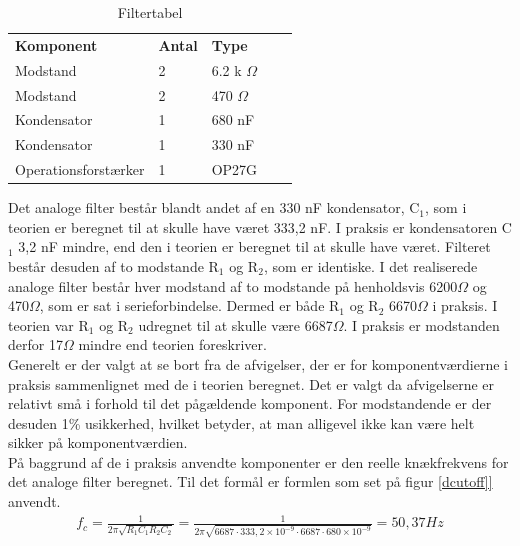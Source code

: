 \begin{table}[H]
\centering
\begin{tabular}{|l|l|l|ll}
\cline{1-3}
\textbf{Komponent} & \textbf{Antal} & \textbf{Type}  &  &  \\ \cline{1-3}
Modstand           & 2              & 6.2 k $\Omega$ &  &  \\ \cline{1-3}
Modstand           & 2              & 470 $\Omega$   &  &  \\ \cline{1-3}
Kondensator        & 1              & 680 nF         &  &  \\ \cline{1-3}
Kondensator        & 1              & 330 nF         &  &  \\ \cline{1-3}
Operationsforstærker &    1         & OP27G          &  &  \\ \cline{1-3}
\end{tabular}
\caption{Filtertabel}
\label{DFiltertabel}
\end{table}

Det analoge filter består blandt andet af en 330 nF kondensator, C$_1$, som i teorien er beregnet til at skulle have været 333,2 nF. I praksis er kondensatoren C$_1$ 3,2 nF mindre, end den i teorien er beregnet til at skulle have været. Filteret består desuden af to modstande R$_1$ og R$_2$, som er identiske. I det realiserede analoge filter består hver modstand af to modstande på henholdsvis 6200$\Omega$ og 470$\Omega$, som er sat i serieforbindelse. Dermed er både R$_1$ og R$_2$ 6670$\Omega$ i praksis. I teorien var R$_1$ og R$_2$ udregnet til at skulle være 6687$\Omega$. I praksis er modstanden derfor 17$\Omega$ mindre end teorien foreskriver.\\

Generelt er der valgt at se bort fra de afvigelser, der er for komponentværdierne i praksis sammenlignet med de i teorien beregnet. Det er valgt da afvigelserne er relativt små i forhold til det pågældende komponent. For modstandende er der desuden 1\% usikkerhed, hvilket betyder, at man alligevel ikke kan være helt sikker på komponentværdien.\\

På baggrund af de i praksis anvendte komponenter er den reelle knækfrekvens for det analoge filter beregnet. Til det formål er formlen som set på figur \ref{dcutoff]} anvendt.\\

\begin{align}
f_{c} = \frac{1}{2\pi \sqrt{R_{1}C_{1}R_{2}C_{2}}} = \frac{1}{2\pi \sqrt{6687 \cdot 333,2\times 10^{-9} \cdot 6687 \cdot 680\times 10^{-9}}} = 50,37 Hz
	\label{dcutoff}
\end{align}

